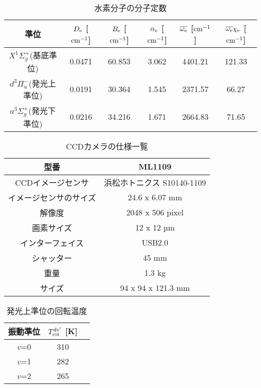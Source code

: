 \listoftables
{}

\begin{table}
    \caption{水素分子の分子定数\cite{nist}}
    \label{table:molecular-constants}
    \centering
    \begin{tabular}{cccccc}
        \hline
        準位 & $D_{\rm e}$ [$\rm cm^{-1}$]& $B_{\rm e}$ [$\rm cm^{-1}$]& $\alpha_{\rm e}$ [$\rm cm^{-1}$]& $\overline{\omega_{\rm e}}$ [$\rm cm^{-1}$]& $\overline{\omega_{\rm e}} \chi_{\rm e}$ [$\rm cm^{-1}$]\\
        \hline
        $X^1 \Sigma^+_g$(基底準位) & 0.0471 & 60.853 & 3.062 & 4401.21 & 121.33\\
        $d^3 \Pi^-_u$(発光上準位) & 0.0191 & 30.364 & 1.545 & 2371.57 & 66.27\\
        $a^3 \Sigma^+_g$(発光下準位) & 0.0216 & 34.216 & 1.671 & 2664.83 & 71.65\\
        \hline
    \end{tabular}
\end{table}

\begin{table}
    \caption{CCDカメラの仕様一覧\cite{CCD-spec}}
    \label{table:CCD-spec}
    \centering
    \begin{tabular}{|c|c|}
        \hline
        型番 & ML1109\\
        \hline
        CCDイメージセンサ & 浜松ホトニクス S10140-1109\\
        \hline
        イメージセンサのサイズ &24.6 x 6.07 mm\\
        \hline
        解像度 & 2048 x 506 pixel\\
        \hline
        画素サイズ & 12 x 12 µm\\
        \hline
        インターフェイス & USB2.0\\
        \hline
        シャッター & 45 mm\\
        \hline
        重量 & 1.3 kg\\
        \hline
        サイズ & 94 x 94 x 121.3 mm\\
        \hline
    \end{tabular}
\end{table}

\begin{table}
    \caption{発光上準位の回転温度}
    \label{table:upper-temperatures}
    \centering
    \begin{tabular}{ccc}
        \hline
        振動準位 & $T^{dv'}_{\rm rot}$ [K]\\
        \hline
        $v$=0 & 310\\
        $v$=1 & 282\\
        $v$=2 & 265\\
        \hline
    \end{tabular}
\end{table}

